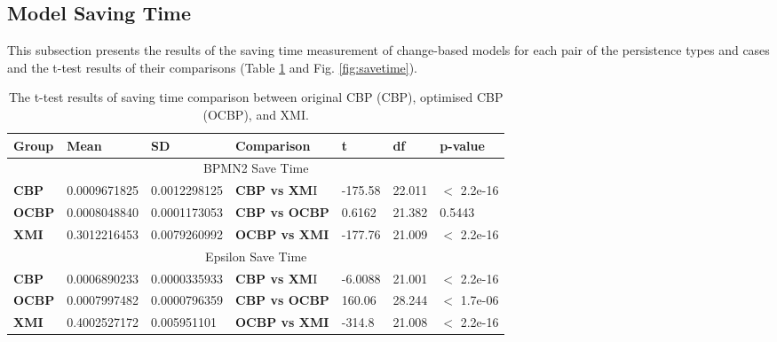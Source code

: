 \documentclass{llncs}
\begin{document}
\subsection{Model Saving Time}
\label{subsec:saving_time_test}
 This subsection presents the results of the saving time measurement of change-based models for each pair of the persistence types and cases and the t-test results of their comparisons (Table \ref{table:ttest_results_savetime} and Fig. \ref{fig:savetime}).   
 
 \vspace{-25pt}
 \begin{table}[ht]
     \small
     \centering
     \caption{The t-test results of saving time comparison between original CBP (CBP), optimised CBP (OCBP), and XMI.}
     \label{table:ttest_results_savetime}
     \begin{tabular}
         {|p{}|p{}|p{}|p{}|p{}|p{}|p{}|}
         \hline 
         
         \textbf{Group} & \textbf{Mean} & \textbf{SD} & \textbf{Comparison} & \textbf{t}  & \textbf{df} & \textbf{p-value} \\  
         \hline 
         \multicolumn{7}{|c|}{BPMN2 Save Time} \\
         \hline 
         \textbf{CBP} & 0.0009671825    & 0.0012298125 & \textbf{CBP vs XM}I &  -175.58    & 22.011 & $<$ 2.2e-16 \\  
         \hline 
         \textbf{OCBP} & 0.0008048840   & 0.0001173053 & \textbf{CBP vs OCBP} & 0.6162 & 21.382  & 0.5443 \\  
         \hline 
         \textbf{XMI} & 0.3012216453   & 0.0079260992 & \textbf{OCBP vs XMI} & -177.76    & 21.009  & $<$ 2.2e-16 \\ 
         \hline 
         
         \multicolumn{7}{|c|}{Epsilon Save Time} \\
         \hline 
         \textbf{CBP} & 0.0006890233    & 0.0000335933 &  \textbf{CBP vs XM}I & -6.0088   &21.001 & $<$ 2.2e-16 \\
         \hline 
         \textbf{OCBP} & 0.0007997482   &  0.0000796359 & \textbf{CBP vs OCBP} & 160.06 & 28.244 & $<$ 1.7e-06 \\  
         \hline 
         \textbf{XMI} & 0.4002527172   & 0.005951101 & \textbf{OCBP vs XMI} & -314.8  & 21.008  & $<$ 2.2e-16 \\ 
         \hline 
         

\end{tabular}
\end{table}
\end{document}
